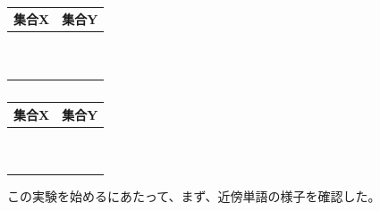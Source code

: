 \begin{table}[h]
  \begin{minipage}[t]{.45\textwidth}
    \caption[]{}
    \label{}
    \begin{center}
      \begin{tabular}{|c||c|} \hline
        集合X & 集合Y \\ \hline \hline
         &  \\
         &  \\
         &  \\
         &  \\
         &  \\
         &  \\
         &  \\
         &  \\
         &  \\
         &  \\ \hline
      \end{tabular}
    \end{center}
  \end{minipage}
  \hfill
  \begin{minipage}[t]{.45\textwidth}
    \caption[]{}
    \label{}
    \begin{center}
      \begin{tabular}{|c||c|} \hline
        集合X & 集合Y \\ \hline \hline
         &  \\
         &  \\
         &  \\
         &  \\
         &  \\
         &  \\
         &  \\
         &  \\
         &  \\
         &  \\ \hline
      \end{tabular}
    \end{center}
  \end{minipage}
\end{table}

この実験を始めるにあたって、まず、近傍単語の様子を確認した。

